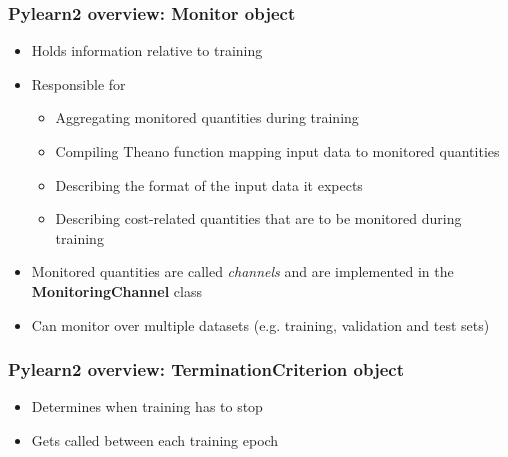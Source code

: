 \documentclass[mathserif, xcolor=dvipsnames]{beamer}
\begin{document}
\begin{frame}
    \frametitle{Pylearn2 overview: \textbf{Monitor} object}
    \begin{itemize}\addtolength{\itemsep}{0.5\baselineskip}
        \item{Holds information relative to training}
        \item{
            Responsible for
            \begin{itemize}
                \item{Aggregating monitored quantities during training}
                \item{Compiling Theano function mapping input data to monitored
                      quantities}
                \item{Describing the format of the input data it expects}
                \item{Describing cost-related quantities that are to be
                      monitored during training}
            \end{itemize}
        }
    \item{Monitored quantities are called \emph{channels} and are implemented in
          the \textbf{MonitoringChannel} class}
    \item{Can monitor over multiple datasets (e.g. training, validation and test
          sets)}
    \end{itemize}

\end{frame}

\begin{frame}
    \frametitle{Pylearn2 overview: \textbf{TerminationCriterion} object}
    \Large
    \begin{itemize}\addtolength{\itemsep}{2.5\baselineskip}
        \item{Determines when training has to stop}
        \item{Gets called between each training epoch}
    \end{itemize}

\end{frame}
\end{document}
